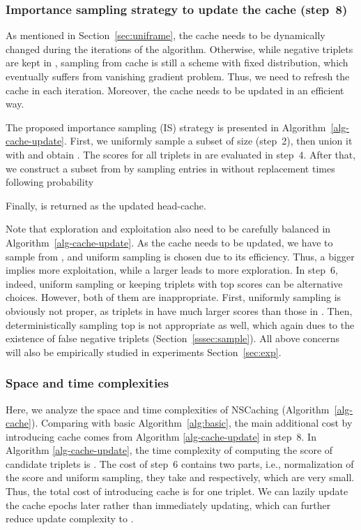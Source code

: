 \documentclass[conference]{IEEEtran}
\begin{document}
\subsubsection{Importance sampling strategy to update the cache (step~8)}
\label{sssec:update}
As mentioned in Section~\ref{sec:uniframe},
the cache needs to be dynamically 
changed during the iterations of the algorithm.
Otherwise,
while negative triplets are kept in ,
sampling from cache is still a scheme with fixed distribution,
which eventually suffers from vanishing gradient problem.
Thus,
we need to refresh the cache in each iteration.
Moreover,
the cache needs to be updated in an efficient way.

The proposed importance sampling (IS) strategy is presented in 
Algorithm~\ref{alg-cache-update}.
First,
we uniformly sample a subset  of size  (step~2),
then union it with  and obtain .
The scores for all triplets in  are evaluated in step~4.
After that,
we construct a subset  from 
by sampling entries in  without replacement  times following 
probability 

Finally,
 is returned as the updated head-cache.





Note that exploration and exploitation also need to be carefully balanced in Algorithm~\ref{alg-cache-update}.
As the cache needs to be updated,
we have to sample from ,
and uniform sampling is chosen due to its efficiency.
Thus,
a bigger  implies more exploitation,
while a larger  leads to more exploration.
In step~6,
indeed, 
uniform sampling or keeping triplets with top  scores can be alternative choices.
However,  
both of them are inappropriate.
First,
uniformly sampling is obviously not proper,
as triplets in  have much larger scores than those in .
Then,
deterministically sampling top  is not appropriate as well,
which again dues to the existence of false negative triplets (Section~\ref{sssec:sample}).
All above concerns will also be empirically studied in experiments Section~\ref{sec:exp}.




\subsubsection{Space and time complexities}
\label{sssec:complexity}
Here,
we analyze the space and time complexities of NSCaching (Algorithm~\ref{alg-cache}).
Comparing with basic Algorithm~\ref{alg:basic},
the main additional cost by introducing cache comes from Algorithm \ref{alg-cache-update} in step~8. 
In Algorithm \ref{alg-cache-update},
the time complexity of computing the score of  candidate triplets  is .
The cost of step~6 contains two parts,
i.e., normalization of the score and uniform sampling,
they take  and  respectively,
which are very small.
Thus, the total cost of introducing cache is  for one triplet.
We can lazily update the cache  epochs later rather than immediately updating,
which can further reduce update complexity to .
\end{document}
